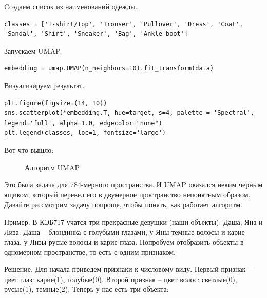 	Cоздаем список из наименований одежды.
\begin{verbatim}
classes = ['T-shirt/top', 'Trouser', 'Pullover', 'Dress', 'Coat', 
'Sandal', 'Shirt', 'Sneaker', 'Bag', 'Ankle boot']
\end{verbatim}

Запускаем UMAP.
\begin{verbatim}
embedding = umap.UMAP(n_neighbors=10).fit_transform(data)
\end{verbatim}

	Визуализируем результат.
	\begin{verbatim}
plt.figure(figsize=(14, 10))
sns.scatterplot(*embedding.T, hue=target, s=4, palette = 'Spectral',
legend='full', alpha=1.0, edgecolor="none")
plt.legend(classes, loc=1, fontsize='large')
	\end{verbatim}

Вот что вышло:

\begin{figure}[bh]
	\noindent{}
	\caption{Алгоритм UMAP}
	\label{figCurves}
\end{figure} 

Это была задача для 784-мерного пространства. И UMAP оказался неким черным ящиком, который перевел его в двумерное пространство непонятным образом. Давайте рассмотрим задачу попроще, чтобы понять, как работает алгоритм.

Пример. В КЭБ717 учатся три прекрасные девушки (наши объекты): Даша, Яна и Лиза. Даша -- блондинка с голубыми глазами, у Яны темные волосы и карие глаза, у Лизы русые волосы и карие глаза. Попробуем отобразить объекты в одномерном пространстве, то есть с одним признаком.

Решение. Для начала приведем признаки к числовому виду. Первый признак -- цвет глаз: карие(1), голубые(0). Второй признак -- цвет волос: светлые(0), русые(1), темные(2). Теперь у нас есть три объекта:

